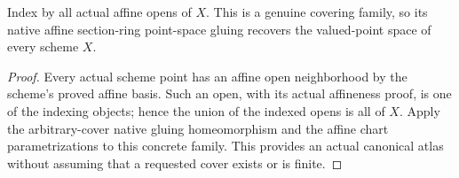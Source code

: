 \begin{theorem}
\label{scheme:canonical-native-affine-atlas}
\leanok
{}
Index by all actual affine opens of $X$. This is a genuine covering family,
so its native affine section-ring point-space gluing recovers the valued-point
space of every scheme $X$.
\end{theorem}
\begin{proof}
Every actual scheme point has an affine open neighborhood by the scheme's
proved affine basis. Such an open, with its actual affineness proof, is one of
the indexing objects; hence the union of the indexed opens is all of $X$.
Apply the arbitrary-cover native gluing homeomorphism and the affine chart
parametrizations to this concrete family. This provides an actual canonical
atlas without assuming that a requested cover exists or is finite.
\end{proof}
